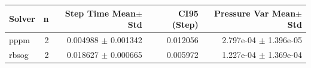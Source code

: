 \begin{tabular}{lrrrr}
\toprule
Solver & n & Step Time Mean$\pm$Std & CI95 (Step) & Pressure Var Mean$\pm$Std \\
\midrule
pppm & 2 & 0.004988 $\pm$ 0.001342 & 0.012056 & 2.797e-04 $\pm$ 1.396e-05 \\
rbsog & 2 & 0.018627 $\pm$ 0.000665 & 0.005972 & 1.227e-04 $\pm$ 1.369e-04 \\
\bottomrule
\end{tabular}

